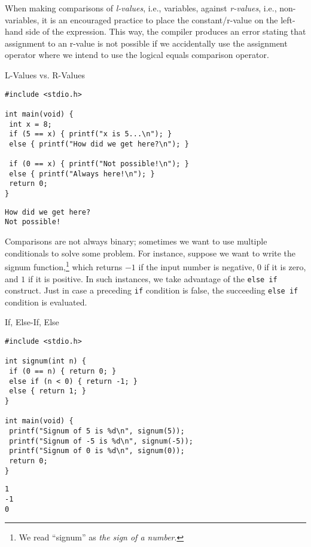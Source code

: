 When making comparisons of \textit{l-values}, i.e., variables, against \textit{r-values}, i.e., non-variables, it is an encouraged practice to place the constant/r-value on the left-hand side of the expression. This way, the compiler produces an error stating that assignment to an r-value is not possible if we accidentally use the assignment operator where we intend to use the logical equals comparison operator. 

\begin{clo}[main.c]{L-Values vs. R-Values}
\begin{lstlisting}[language=MyC]
#include <stdio.h>

int main(void) {
 int x = 8;
 if (5 == x) { printf("x is 5...\n"); }
 else { printf("How did we get here?\n"); }

 if (0 == x) { printf("Not possible!\n"); }
 else { printf("Always here!\n"); }
 return 0;
}
\end{lstlisting}
\tcblower
\begin{lstlisting}[language=MyOutput]
How did we get here?
Not possible!
\end{lstlisting}
\end{clo}

Comparisons are not always binary; sometimes we want to use multiple conditionals to solve some problem. For instance, suppose we want to write the \textsf{signum} function,\footnote{We read ``signum'' as \textit{the sign of a number}.} which returns $-1$ if the input number is negative, $0$ if it is zero, and $1$ if it is positive. In such instances, we take advantage of the \texttt{else if} construct. Just in case a preceding \texttt{if} condition is false, the succeeding \texttt{else if} condition is evaluated. 

\begin{clo}[]{If, Else-If, Else}
\begin{lstlisting}[language=MyC]
#include <stdio.h>

int signum(int n) {
 if (0 == n) { return 0; } 
 else if (n < 0) { return -1; }
 else { return 1; }
}

int main(void) {
 printf("Signum of 5 is %d\n", signum(5));
 printf("Signum of -5 is %d\n", signum(-5));
 printf("Signum of 0 is %d\n", signum(0));
 return 0;
}
\end{lstlisting}
\tcblower
\begin{lstlisting}[language=MyOutput]
1
-1
0
\end{lstlisting}
\end{clo}

